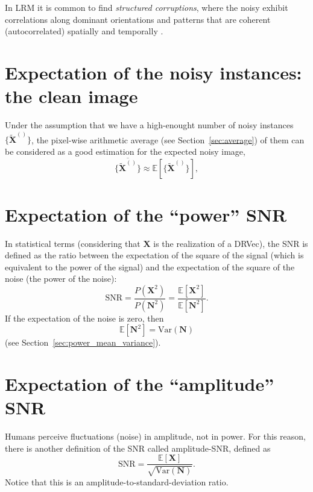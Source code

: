 In \gls{LRM} it is common to find \emph{structured corruptions}, where
the noisy exhibit correlations along dominant orientations and
patterns that are coherent (autocorrelated) spatially and temporally
\cite{wang2025median2median}. %



\section{Expectation of the noisy instances: the clean image}
Under the assumption that we have a high-enought number of noisy
instances $\{\tilde{\bm{X}}^{()}\}$, the pixel-wise
arithmetic average (see Section~\ref{sec:average}) of them can be
considered as a good estimation for the expected noisy image,
\begin{equation}
  \overline{\{\tilde{\bm{X}}^{()}\}} \approx \mathbb{E}[\{\tilde{\bm{X}}^{()}\}],
\end{equation}

\section{Expectation of the ``power'' \gls{SNR}}
In statistical terms (considering that $\bm{X}$ is the realization of
a \gls{DRVec}), the \gls{SNR} is defined as the ratio between the
expectation of the square of the signal (which is equivalent to the
power of the signal) and the expectation of the square of the noise
(the power of the noise):
\begin{equation}
  \text{SNR} = \frac{P(\bm{X}^2)}{P(\bm{N}^2)}=\frac{\mathbb{E}[\bm{X}^2]}{\mathbb{E}[\bm{N}^2]}.
  \label{eq:power_SNR_statistics}
\end{equation}
If the expectation of the noise is zero, then 
\begin{equation}
  \mathbb{E}[\bm{N}^2] = \text{Var}(\bm{N})
  \label{eq:expectation_variance}
\end{equation}
(see Section~\ref{sec:power_mean_variance}).

\section{Expectation of the ``amplitude'' \gls{SNR}}
Humans perceive fluctuations (noise) in amplitude, not in power. For
this reason, there is another definition of the \gls{SNR} called
amplitude-\gls{SNR}, defined as
\begin{equation}
  \text{SNR} = \frac{\mathbb{E}[\bm{X}]}{\sqrt{\text{Var}(\bm{N})}}.
  \label{eq:amplitude_SNR_statistics}
\end{equation}
Notice that this is an amplitude-to-standard-deviation ratio.

